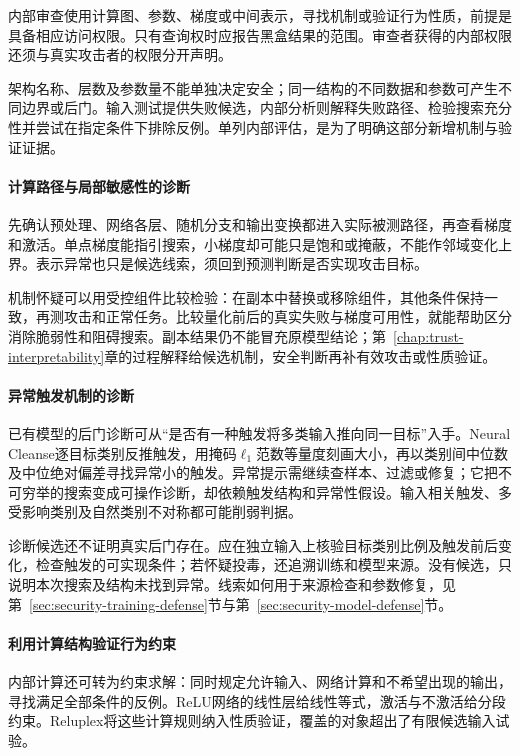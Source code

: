 内部审查使用计算图、参数、梯度或中间表示，寻找机制或验证行为性质，前提是具备相应访问权限。只有查询权时应报告黑盒结果的范围。审查者获得的内部权限还须与真实攻击者的权限分开声明。

架构名称、层数及参数量不能单独决定安全；同一结构的不同数据和参数可产生不同边界或后门。输入测试提供失败候选，内部分析则解释失败路径、检验搜索充分性并尝试在指定条件下排除反例。单列内部评估，是为了明确这部分新增机制与验证证据。

\paragraph{计算路径与局部敏感性的诊断}

先确认预处理、网络各层、随机分支和输出变换都进入实际被测路径，再查看梯度和激活。单点梯度能指引搜索，小梯度却可能只是饱和或掩蔽，不能作邻域变化上界。表示异常也只是候选线索，须回到预测判断是否实现攻击目标。

机制怀疑可以用受控组件比较检验：在副本中替换或移除组件，其他条件保持一致，再测攻击和正常任务。比较量化前后的真实失败与梯度可用性，就能帮助区分消除脆弱性和阻碍搜索。副本结果仍不能冒充原模型结论；第~\ref{chap:trust-interpretability}章的过程解释给候选机制，安全判断再补有效攻击或性质验证。

\paragraph{异常触发机制的诊断}

已有模型的后门诊断可从“是否有一种触发将多类输入推向同一目标”入手。Neural Cleanse逐目标类别反推触发，用掩码$\ell_1$范数等量度刻画大小，再以类别间中位数及中位绝对偏差寻找异常小的触发。异常提示需继续查样本、过滤或修复；它把不可穷举的搜索变成可操作诊断，却依赖触发结构和异常性假设。输入相关触发、多受影响类别及自然类别不对称都可能削弱判据。

诊断候选还不证明真实后门存在。应在独立输入上核验目标类别比例及触发前后变化，检查触发的可实现条件；若怀疑投毒，还追溯训练和模型来源。没有候选，只说明本次搜索及结构未找到异常。线索如何用于来源检查和参数修复，见第~\ref{sec:security-training-defense}节与第~\ref{sec:security-model-defense}节。

\paragraph{利用计算结构验证行为约束}

内部计算还可转为约束求解：同时规定允许输入、网络计算和不希望出现的输出，寻找满足全部条件的反例。ReLU网络的线性层给线性等式，激活与不激活给分段约束。Reluplex将这些计算规则纳入性质验证，覆盖的对象超出了有限候选输入试验。

